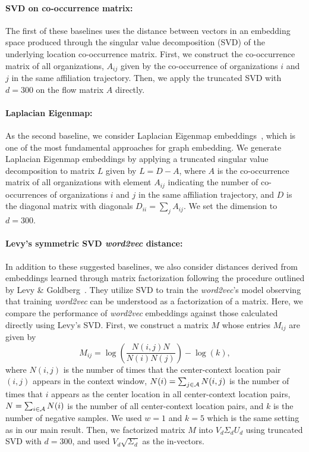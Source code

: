 \documentclass[12pt,a4paper]{article}
\begin{document}
\vspace{-0.5cm}
\paragraph{SVD on co-occurrence matrix:}The first of these baselines uses the distance between vectors in an embedding space produced through the singular value decomposition (SVD) of the underlying location co-occurrence matrix. First, we construct the co-occurrence matrix of all organizations, $A_{ij}$ given by the co-occurrence of organizations $i$ and $j$ in the same affiliation trajectory.
Then, we apply the truncated SVD with $d=300$ on the flow matrix $A$ directly.

\vspace{-0.3cm}
\paragraph{Laplacian Eigenmap:} As the second baseline, we consider Laplacian Eigenmap embeddings~\autocite{belkin2003laplacian}, which is one of the most fundamental approaches for graph embedding. We generate Laplacian Eigenmap embeddings by applying a truncated singular value decomposition to matrix $L$ given by $L=D - A$, where
$A$ is the co-occurrence matrix of all organizations with element $A_{ij}$ indicating the number of co-occurrences of organizations $i$ and $j$ in the same affiliation trajectory, and $D$ is the diagonal matrix with diagonals $D_{ii}=\sum_j {A_{ij}}$. We set the dimension to $d=300$.

\vspace{-0.3cm}
\paragraph{Levy's  symmetric SVD \textit{word2vec} distance:} In addition to these suggested baselines, we also consider distances derived from embeddings learned through matrix factorization following the procedure outlined by Levy \& Goldberg~\autocite{levy2014neural}.
They utilize SVD to train the {\it word2vec}'s model observing that training \textit{word2vec} can be understood as a factorization of a matrix.
Here, we compare the performance of \textit{word2vec} embeddings against those calculated directly using Levy's SVD.
First, we construct a matrix $M$ whose entries $M_{ij}$ are given by
\begin{equation}
	\label{eq:levyword2vec}
	M_{ij} = \log\left(\frac{N(i,j) N}{N(i) N(j)}\right) - \log(k),
\end{equation}
where $N(i,j)$ is the number of times that the center-context location pair $(i,j)$ appears in the context window, $N(i)=\sum_{j\in {\cal A}} N(i,j)$ is the number of times that $i$ appears as the center location in all center-context location pairs, $N=\sum_{i \in {\cal A}} N(i)$ is the number of all center-context location pairs, and $k$ is the number of negative samples. We used $w=1$ and $k=5$ which is the same setting as in our main result. Then, we factorized matrix $M$ into $V_d \Sigma_d U_d$ using truncated SVD with $d=300$, and used $V_d\sqrt{\Sigma_d}$ as the in-vectors.
\end{document}
